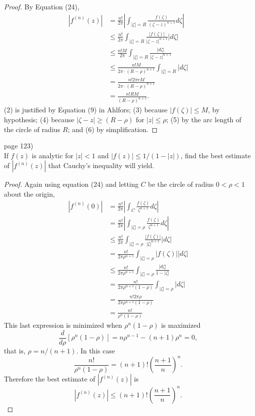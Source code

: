 \documentclass{article}
\newenvironment{problem}[2][Problem]{\begin{trivlist}
\item[\hskip \labelsep {\bfseries #1}\hskip \labelsep {\bfseries #2.}]}{\end{trivlist}}
\begin{document}
\begin{proof}
  By Equation (24), \begin{align}
    |f^{(n)}(z)|
    &= \frac{n!}{2\pi}\left|\int_{|\zeta| = R} \frac{f(\zeta)}{(\zeta - z)^{n+1}}d\zeta\right|\\
    &\leq \frac{n!}{2\pi}\int_{|\zeta| = R} \frac{|f(\zeta)|}{|\zeta - z|^{n+1}}|d\zeta|\\
    &\leq \frac{n!M}{2\pi}\int_{|\zeta| = R} \frac{|d\zeta|}{|\zeta - z|^{n+1}}\\
    &\leq \frac{n!M}{2\pi\cdot(R-\rho)^{n+1}}\int_{|\zeta| = R} |d\zeta|\\
    &= \frac{n!2\pi rM}{2\pi\cdot(R-\rho)^{n+1}} \\
    &= \frac{n!RM}{(R-\rho)^{n+1}}.
  \end{align}
  (2) is justified by Equation (9) in Ahlfors;
  (3) because $|f(\zeta)| \leq M$, by hypothesis;
  (4) because $|\zeta - z| \geq (R-\rho)$ for $|z| \leq \rho$;
  (5) by the arc length of the circle of radius $R$; and (6) by simplification.
\end{proof}

\pagebreak

\begin{problem}{4} (page 123) \\
  If $f(z)$ is analytic for $|z| < 1$ and $|f(z)| \leq 1/(1-|z|)$, find the best
  estimate of $|f^{(n)}(z)|$ that Cauchy's inequality will yield.
\end{problem}

\begin{proof}
  Again using equation (24) and letting $C$ be the circle of radius $0 < \rho < 1$ about the origin,
  \setcounter{equation}{0}
  \begin{align}
  |f^{(n)}(0)|
  &= \frac{n!}{2\pi}\left|\int_C \frac{f(\zeta)}{\zeta^{n+1}}d\zeta\right|\\
  &= \frac{n!}{2\pi}\left|\int_{|\zeta| = \rho} \frac{f(\zeta)}{\zeta^{n+1}}d\zeta\right|\\
  &\leq \frac{n!}{2\pi}\int_{|\zeta| = \rho} \frac{|f(\zeta)|}{|\zeta|^{n+1}}|d\zeta|\\
  &= \frac{n!}{2\pi\rho^{n+1}}\int_{|\zeta| = \rho} |f(\zeta)||d\zeta|\\
  &\leq \frac{n!}{2\pi\rho^{n+1}}\int_{|\zeta| = \rho} \frac{|d\zeta|}{1-|\zeta|}\\
  &= \frac{n!}{2\pi\rho^{n+1}(1-\rho)}\int_{|\zeta| = \rho} |d\zeta|\\
  &= \frac{n!2\pi\rho}{2\pi\rho^{n+1}(1-\rho)}\\
  &= \frac{n!}{\rho^n(1-\rho)}
  \end{align}
  This last expression is minimized when $\rho^n(1-\rho)$ is maximized \[
    \frac{d}{d\rho}[\rho^n(1-\rho)] = n\rho^{n-1} - (n + 1)\rho^n = 0,
  \] that is, $\rho = n/(n+1)$. In this case \[
    \frac{n!}{\rho^n(1-\rho)} = (n+1)!\left(\frac{n+1}{n}\right)^n.
  \] Therefore the best estimate of $|f^{(n)}(z)|$ is \[
    |f^{(n)}(z)| \leq (n+1)!\left(\frac{n+1}{n}\right)^n.
  \]
\end{proof}
\end{document}
